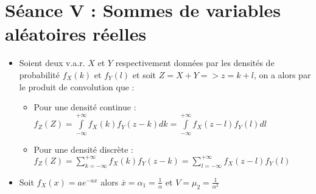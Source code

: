 \documentclass[a4paper,11pt]{report}
\begin{document}
\section{Séance V : Sommes de variables aléatoires réelles}
\begin{itemize}
	\item Soient deux v.a.r. $X$ et $Y$ respectivement données par les densités de probabilité $f_X(k)$ et $f_Y(l)$ et soit $Z = X+Y => z = k+l$, on a alors par le produit de convolution que :
	\begin{itemize}
		\item Pour une densité continue :\\
		$f_Z(Z) = \int\limits_{-\infty}^{+\infty}{f_X(k)f_Y(z-k)dk} = \int\limits_{-\infty}^{+\infty}{f_X(z-l)f_Y(l)dl}$
		\item Pour une densité discrète :\\
		$f_Z(Z) = \sum\limits_{k=-\infty}^{+\infty}{f_X(k)f_Y(z-k)} = \sum\limits_{l=-\infty}^{+\infty}{f_X(z-l)f_Y(l)}$ 
	\end{itemize}
	\item Soit $f_X(x) = ae^{-ax}$ alors $\overline{x} = \alpha_1 = \frac{1}{\alpha}$ et $V = \mu_2 = \frac{1}{\alpha^2}$ 
\end{itemize}

\newpage
\end{document}
